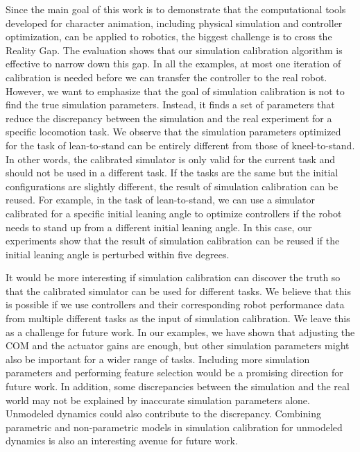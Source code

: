 Since the main goal of this work is to demonstrate that the computational tools developed for character animation, including physical simulation and controller optimization, can be applied to robotics, the biggest challenge is to cross the Reality Gap. The evaluation shows that our simulation calibration algorithm is effective to narrow down this gap. In all the examples, at most one iteration of calibration is needed before we can transfer the controller to the real robot. However, we want to emphasize that the goal of simulation calibration is not to find the  true simulation parameters. Instead, it finds a set of parameters that reduce the discrepancy between the simulation and the real experiment for a specific locomotion task. We observe that the simulation parameters optimized for the task of lean-to-stand can be entirely different from those of kneel-to-stand. In other words, the calibrated simulator is only valid for the current task and should not be used in a different task. If the tasks are the same but the initial configurations are slightly different, the result of simulation calibration can be reused. For example, in the task of lean-to-stand, we can use a simulator calibrated for a specific initial leaning angle to optimize controllers if the robot needs to stand up from a different initial leaning angle. In this case, our experiments show that the result of simulation calibration can be reused if the initial leaning angle is perturbed within five degrees. 

It would be more interesting if simulation calibration can discover the truth so that the calibrated simulator can be used for different tasks. We believe that this is possible if we use controllers and their corresponding robot performance data from multiple different tasks as the input of simulation calibration. We leave this as a challenge for future work. In our examples, we have shown that adjusting the COM and the actuator gains are enough, but other simulation parameters might also be important for a wider range of tasks. Including more simulation parameters and performing feature selection would be a promising direction for future work. In addition, some discrepancies between the simulation and the real world may not be explained by inaccurate simulation parameters alone. Unmodeled dynamics could also contribute to the discrepancy. Combining parametric and non-parametric models in simulation calibration for unmodeled dynamics is also an interesting avenue for future work.


